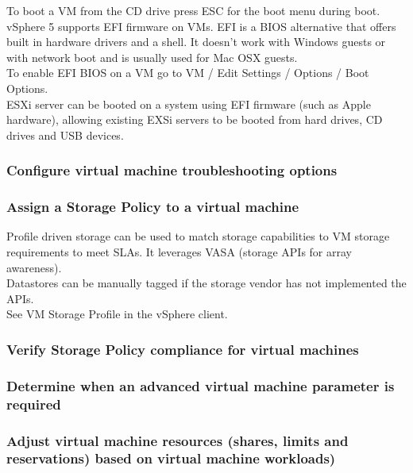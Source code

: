 To boot a VM from the CD drive press ESC for the boot menu during boot.\\

vSphere 5 supports EFI firmware on VMs. EFI is a BIOS alternative that offers
built in hardware drivers and a shell. It doesn't work with Windows guests
or with network boot and is usually used for Mac OSX guests.\\

To enable EFI BIOS on a VM go to VM / Edit Settings / Options / Boot Options.\\

ESXi server can be booted on a system using EFI firmware (such as Apple
hardware), allowing existing EXSi servers to be booted from hard drives, CD
drives and USB devices.

\subsubsection{Configure virtual machine troubleshooting options}

\subsubsection{Assign a Storage Policy to a virtual machine}

Profile driven storage can be used to match storage capabilities to VM storage
requirements to meet SLAs. It leverages VASA (storage APIs for array
awareness).\\

Datastores can be manually tagged if the storage vendor has not implemented
the APIs.\\

See VM Storage Profile in the vSphere client.

\subsubsection{Verify Storage Policy compliance for virtual machines}

\subsubsection{Determine when an advanced virtual machine parameter is required}

\subsubsection{Adjust virtual machine resources (shares, limits and reservations) based on virtual machine workloads)}
